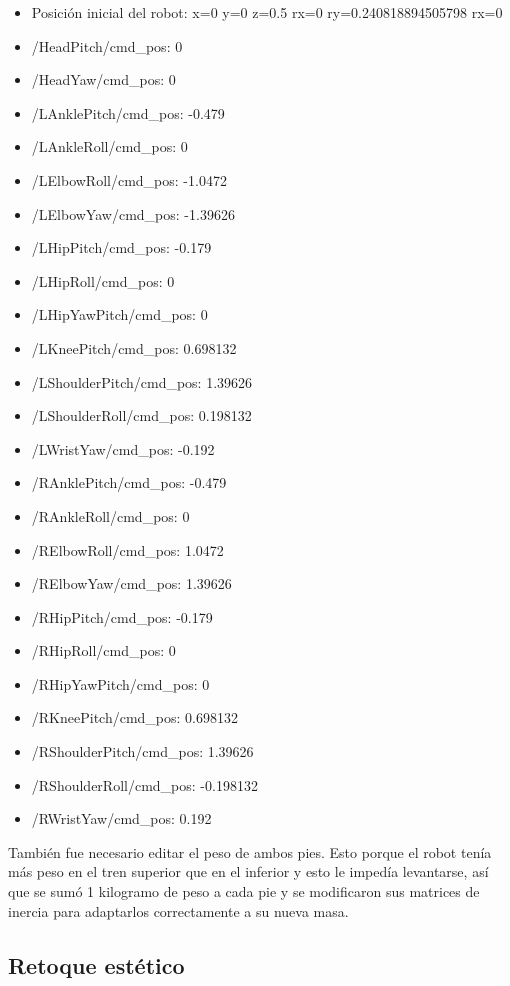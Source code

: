 \begin{itemize}
  \item Posición inicial del robot: x=0 y=0 z=0.5 rx=0 ry=0.240818894505798 rx=0
  \item /HeadPitch/cmd\_pos: 0
  \item /HeadYaw/cmd\_pos: 0
  \item /LAnklePitch/cmd\_pos: -0.479
  \item /LAnkleRoll/cmd\_pos: 0
  \item /LElbowRoll/cmd\_pos: -1.0472
  \item /LElbowYaw/cmd\_pos: -1.39626
  \item /LHipPitch/cmd\_pos: -0.179
  \item /LHipRoll/cmd\_pos: 0
  \item /LHipYawPitch/cmd\_pos: 0
  \item /LKneePitch/cmd\_pos: 0.698132
  \item /LShoulderPitch/cmd\_pos: 1.39626
  \item /LShoulderRoll/cmd\_pos: 0.198132
  \item /LWristYaw/cmd\_pos: -0.192
  \item /RAnklePitch/cmd\_pos: -0.479
  \item /RAnkleRoll/cmd\_pos: 0
  \item /RElbowRoll/cmd\_pos: 1.0472
  \item /RElbowYaw/cmd\_pos: 1.39626
  \item /RHipPitch/cmd\_pos: -0.179
  \item /RHipRoll/cmd\_pos: 0
  \item /RHipYawPitch/cmd\_pos: 0
  \item /RKneePitch/cmd\_pos: 0.698132
  \item /RShoulderPitch/cmd\_pos: 1.39626
  \item /RShoulderRoll/cmd\_pos: -0.198132
  \item /RWristYaw/cmd\_pos: 0.192
\end{itemize}

También fue necesario editar el peso de ambos pies. Esto porque el robot tenía más peso en el tren superior que en el inferior y esto le impedía levantarse, así que se sumó 1 kilogramo de peso a cada pie y se modificaron sus matrices de inercia para adaptarlos correctamente a su nueva masa.

\subsection{Retoque estético}

